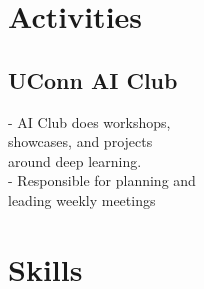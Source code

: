 \documentclass[]{resume-template}
\begin{document}
\begin{minipage}[t]{0.33\textwidth}
    \section{Activities}\label{sec:activities}

    \subsection{UConn AI Club}\label{subsec:uconn-ai-club}
    - AI Club does workshops,\\showcases, and projects \\around deep learning.\\
    - Responsible for planning and\\ leading weekly meetings\\
    \vspace{\topsep}






    \section{Skills}\label{sec:skills}

\end{minipage}
\end{document}
